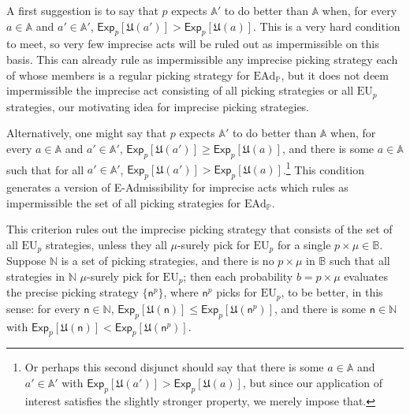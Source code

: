 \documentclass[a4paper,final]{article}
\renewcommand\P{\mathbb{P}} %
\newcommand\Exp{\mathsf{Exp}}
\newcommand\EU{\mathrm{EU}}
\newcommand\EAd{\mathrm{EAd}}
\newcommand\U{\mathfrak{U}} %
\newcommand{\n}{\mathsf{n}}
\newcommand{\imprecpickstrat}{\mathbb{N}}
\newcommand{\IB}{\mathbb{B}}
\newcommand{\IP}{\P}
\renewcommand{\leq}{\leqslant}
\renewcommand{\geq}{\geqslant}
\newenvironment{CCM rewritten}
{\begingroup\color{blue}} %
{\endgroup}              %
\begin{document}
	A first suggestion is to say that $p$ expects $\mathbb{A}'$ to do better than $\mathbb{A}$ when, for every $a\in\mathbb{A}$ and $a'\in\mathbb{A}'$, $\Exp_p[\U(a')]>\Exp_p[\U(a)]$. This is a very hard condition to meet, so very few imprecise acts will be ruled out as impermissible on this basis. This can already rule as impermissible any imprecise picking strategy each of whose members is a regular picking strategy for $\EAd_\IP$, but it does not deem impermissible the imprecise act consisting of all picking strategies or all $\EU_p$ strategies, our motivating idea for imprecise picking strategies. 
	
	Alternatively, one might say that $p$ expects $\mathbb{A}'$ to do better than $\mathbb{A}$ when, for every $a\in\mathbb{A}$ and $a'\in\mathbb{A}'$, $\Exp_p[\U(a')]\geq\Exp_p[\U(a)]$, and there is some $a\in\mathbb{A}$ such that for all $a'\in\mathbb{A}'$, $\Exp_p[\U(a')]>\Exp_p[\U(a)]$.\footnote{Or perhaps this second disjunct should say that there is some $a\in\mathbb{A}$ and $a'\in\mathbb{A}'$ with $\Exp_p[\U(a')]>\Exp_p[\U(a)]$, but since our application of interest satisfies the slightly stronger property, we merely impose that. }
	This condition generates a version of E-Admissibility for imprecise acts which rules as impermissible the set of all picking strategies for $\EAd_\IP$. 
	
	This criterion rules out the imprecise picking strategy that consists of the set of all $\EU_p$ strategies, unless they all $\mu$-surely pick for $\EU_p$ for a single $p \times \mu\in\IB$. 
	Suppose $\imprecpickstrat$ is a set of picking strategies, and there is no $p \times \mu$ in $\IB$ such that all strategies in $\imprecpickstrat$ $\mu$-surely pick for $\EU_p$; then each probability $b=p\times \mu$ evaluates the precise picking strategy $\{\n^p\}$, where $\n^p$ picks for $\EU_p$, to be better, in this sense: for every $\n\in\imprecpickstrat$, $\Exp_p[\U(\n)]\leq \Exp_p[\U(\n^p)]$, and there is some $\n\in\imprecpickstrat$ with $\Exp_p[\U(\n)]<\Exp_p[\U(\n^p)]$. 
%	 
	
\end{document}
